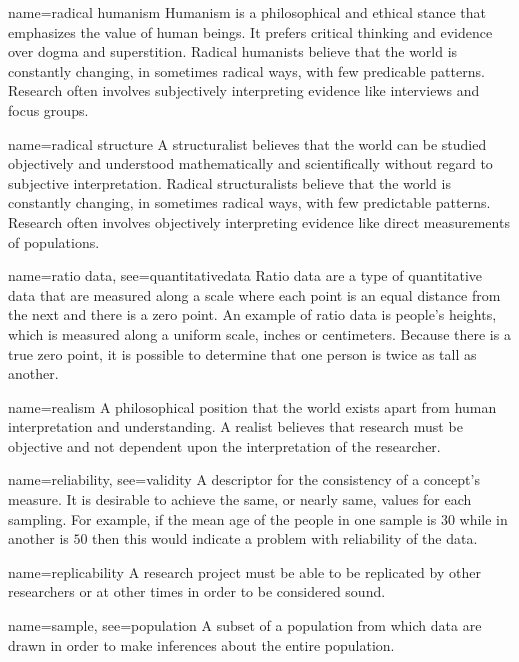 {name={radical humanism}}
{%
	Humanism is a philosophical and ethical stance that emphasizes the value of human beings. It prefers critical thinking and evidence over dogma and superstition. Radical humanists believe that the world is constantly changing, in sometimes radical ways, with few predicable patterns. Research often involves subjectively interpreting evidence like interviews and focus groups.
}

{name={radical structure}}
{%
	A structuralist believes that the world can be studied objectively and understood mathematically and scientifically without regard to subjective interpretation. Radical structuralists believe that the world is constantly changing, in sometimes radical ways, with few predictable patterns. Research often involves objectively interpreting evidence like direct measurements of populations.
}

{name={ratio data},
	see={quantitativedata}}
{%
	Ratio data are a type of quantitative data that are measured along a scale where each point is an equal distance from the next and there is a zero point. An example of ratio data is people's heights, which is measured along a uniform scale, \eg inches or centimeters. Because there is a true zero point, it is possible to determine that one person is twice as tall as another.
}

{name={realism}}
{%
	A philosophical position that the world exists apart from human interpretation and understanding. A realist believes that research must be objective and not dependent upon the interpretation of the researcher.
}


	{name={reliability},
	 see={validity}}
	{%
		A descriptor for the consistency of a concept's measure. It is desirable to achieve the same, or nearly same, values for each sampling. For example, if the mean age of the people in one sample is $ 30 $ while in another is $ 50 $ then this would indicate a problem with reliability of the data.
	}

{name={replicability}}
{%
	A research project must be able to be replicated by other researchers or at other times in order to be considered sound.
}

{name={sample},
	see={population}}
{%
	A subset of a population from which data are drawn in order to make inferences about the entire population.
}

